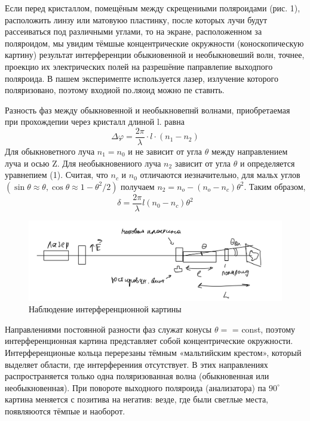 \documentclass[a4paper, 12pt]{article}
\begin{document}
Если перед кристаллом, помещёным между скрещениыми поляроидами (рис. 1), расположить линзу или матовуюо пластинку, после которых лучи будут рассеиваться под различными углами, то на экране, расположенном за поляроидом, мы увидим тёмшые концентрические окружности (коноскопическую картину) результат интерференции обыкиовенной и необыкновеший волн, точнее, проекцио их электрических полей на разрешёние паправлепие выходпого поляроида. В пашем эксперимепте используется лазер, излучение которого поляризовано, поэтому входиой по.ляоид можно пе ставнть.

Разность фаз между обыкновенной и необыкновепнй волнами, приобретаемая при прохождепии через кристалл длиной l. равна
\begin{equation*}
\Delta \varphi=\frac{2 \pi}{\lambda} \cdot l \cdot\left(n_1-n_2\right)
\end{equation*}
Для обыкноветного луча $n_1=n_0$ и не зависит от угла $\theta$ между направлением луча и осью Z. Для необыкновениого луча $n_2$ зависит от угла $\theta$ и определяется уравнепием (1). Считая, что $n_c$ и $n_0$ отличаются иезначительно, для мальх углов $\left(\sin \theta \approx \theta, \cos \theta \approx 1-\theta^2 / 2\right)$ получаем $n_2=n_o-\left(n_o-n_c\right) \theta^2$. Таким образом,
\begin{equation*}
\delta=\frac{2 \pi}{\lambda} l\left(n_0-n_c\right) \theta^2
\end{equation*}

\begin{figure}[H]
    \centering
    \includegraphics[width=1\textwidth]{ris1}
    \caption{Наблюдение интерференционной картины}
    \label{fig:ris1}
\end{figure}

Направлениями постоянной разности фаз служат конусы $\theta=$ = const, поэтому интерференционная картина представляет собой концентрические окружности. Интерференционые кольца перерезаны тёмным «мальтийским крестом», который выделяет области, где интерферениия отсутствует. В этих направлениях распространяется только одна поляризованная волна (обыкновенная или необыкновенная). При повороте выходного поляроида (анализатора) па $90^{\circ}$ картина меняется с позитива на негатив: везде, где были светлые места, появляюотся тёмпые и наоборот.
\end{document}
